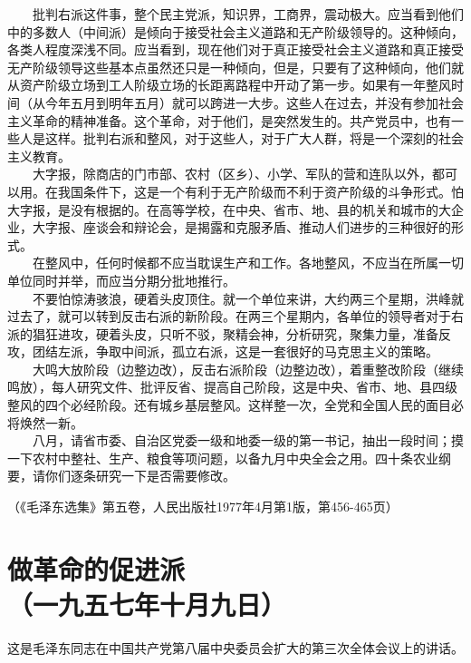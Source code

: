 \documentclass[cn,11pt,chinese]{elegantbook}
\def\myformat#1{\hfil\hfil #1}
\begin{document}
　　批判右派这件事，整个民主党派，知识界，工商界，震动极大。应当看到他们中的多数人（中间派）是倾向于接受社会主义道路和无产阶级领导的。这种倾向，各类人程度深浅不同。应当看到，现在他们对于真正接受社会主义道路和真正接受无产阶级领导这些基本点虽然还只是一种倾向，但是，只要有了这种倾向，他们就从资产阶级立场到工人阶级立场的长距离路程中开动了第一步。如果有一年整风时间（从今年五月到明年五月）就可以跨进一大步。这些人在过去，并没有参加社会主义革命的精神准备。这个革命，对于他们，是突然发生的。共产党员中，也有一些人是这样。批判右派和整风，对于这些人，对于广大人群，将是一个深刻的社会主义教育。\\
　　大字报，除商店的门市部、农村（区乡）、小学、军队的营和连队以外，都可以用。在我国条件下，这是一个有利于无产阶级而不利于资产阶级的斗争形式。怕大字报，是没有根据的。在高等学校，在中央、省市、地、县的机关和城市的大企业，大字报、座谈会和辩论会，是揭露和克服矛盾、推动人们进步的三种很好的形式。\\
　　在整风中，任何时候都不应当耽误生产和工作。各地整风，不应当在所属一切单位同时并举，而应当分期分批地推行。\\
　　不要怕惊涛骇浪，硬着头皮顶住。就一个单位来讲，大约两三个星期，洪峰就过去了，就可以转到反击右派的新阶段。在两三个星期内，各单位的领导者对于右派的猖狂进攻，硬着头皮，只听不驳，聚精会神，分析研究，聚集力量，准备反攻，团结左派，争取中间派，孤立右派，这是一套很好的马克思主义的策略。\\
　　大鸣大放阶段（边整边改），反击右派阶段（边整边改），着重整改阶段（继续鸣放），每人研究文件、批评反省、提高自己阶段，这是中央、省市、地、县四级整风的四个必经阶段。还有城乡基层整风。这样整一次，全党和全国人民的面目必将焕然一新。\\
　　八月，请省市委、自治区党委一级和地委一级的第一书记，抽出一段时间；摸一下农村中整社、生产、粮食等项问题，以备九月中央全会之用。四十条农业纲要，请你们逐条研究一下是否需要修改。\\
\begin{flushright}（《毛泽东选集》第五卷，人民出版社1977年4月第1版，第456-465页）\end{flushright}
\newpage\section*{\myformat{做革命的促进派}\\\myformat{（一九五七年十月九日）}}
\begin{introduction}\item  这是毛泽东同志在中国共产党第八届中央委员会扩大的第三次全体会议上的讲话。\end{introduction}
\end{document}
